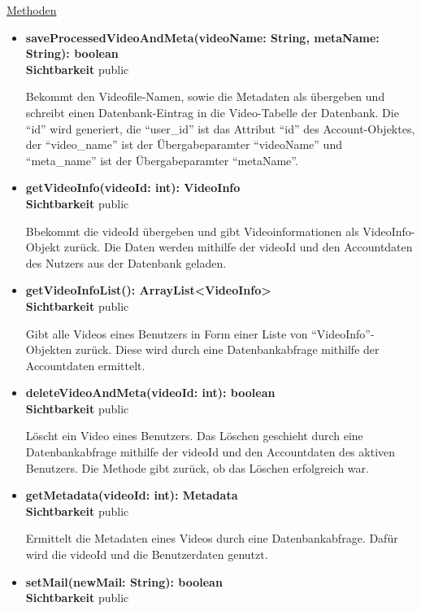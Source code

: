\underline{Methoden}
\begin{itemize}
\itemsep0pt
\item \textbf{saveProcessedVideoAndMeta(videoName: String, metaName: String): boolean}\hfill\\
\textbf{Sichtbarkeit} public

Bekommt den Videofile-Namen, sowie die Metadaten als übergeben und schreibt einen Datenbank-Eintrag in die Video-Tabelle der Datenbank. Die ``id'' wird generiert, die ``user\_id'' ist das Attribut ``id'' des Account-Objektes, der ``video\_name'' ist der Übergabeparamter ``videoName'' und ``meta\_name'' ist der Übergabeparamter ``metaName''.

\item \textbf{getVideoInfo(videoId: int): VideoInfo}\hfill\\
\textbf{Sichtbarkeit} public

Bbekommt die videoId übergeben und gibt Videoinformationen als VideoInfo-Objekt zurück. Die Daten werden mithilfe der videoId und den Accountdaten des Nutzers aus der Datenbank geladen.

\item \textbf{getVideoInfoList(): ArrayList<VideoInfo>}\hfill\\
\textbf{Sichtbarkeit} public

Gibt alle Videos eines Benutzers in Form einer Liste von ``VideoInfo''-Objekten zurück. Diese wird durch eine Datenbankabfrage mithilfe der Accountdaten ermittelt.

\item \textbf{deleteVideoAndMeta(videoId: int): boolean}\hfill\\
\textbf{Sichtbarkeit} public

Löscht ein Video eines Benutzers. Das Löschen geschieht durch eine Datenbankabfrage mithilfe der videoId und den Accountdaten des aktiven Benutzers. Die Methode gibt zurück, ob das Löschen erfolgreich war.

\item \textbf{getMetadata(videoId: int): Metadata}\hfill\\
\textbf{Sichtbarkeit} public

Ermittelt die Metadaten eines Videos durch eine Datenbankabfrage. Dafür wird die videoId und die Benutzerdaten genutzt.

\item \textbf{setMail(newMail: String): boolean}\hfill\\
\textbf{Sichtbarkeit} public


\end{itemize}
